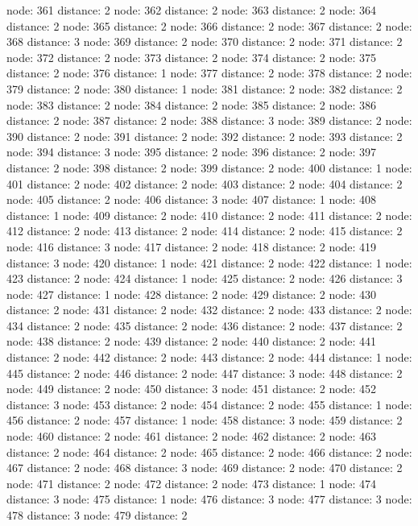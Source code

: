 \documentclass{article}
\begin{document}
node: 361 distance: 2
node: 362 distance: 2
node: 363 distance: 2
node: 364 distance: 2
node: 365 distance: 2
node: 366 distance: 2
node: 367 distance: 2
node: 368 distance: 3
node: 369 distance: 2
node: 370 distance: 2
node: 371 distance: 2
node: 372 distance: 2
node: 373 distance: 2
node: 374 distance: 2
node: 375 distance: 2
node: 376 distance: 1
node: 377 distance: 2
node: 378 distance: 2
node: 379 distance: 2
node: 380 distance: 1
node: 381 distance: 2
node: 382 distance: 2
node: 383 distance: 2
node: 384 distance: 2
node: 385 distance: 2
node: 386 distance: 2
node: 387 distance: 2
node: 388 distance: 3
node: 389 distance: 2
node: 390 distance: 2
node: 391 distance: 2
node: 392 distance: 2
node: 393 distance: 2
node: 394 distance: 3
node: 395 distance: 2
node: 396 distance: 2
node: 397 distance: 2
node: 398 distance: 2
node: 399 distance: 2
node: 400 distance: 1
node: 401 distance: 2
node: 402 distance: 2
node: 403 distance: 2
node: 404 distance: 2
node: 405 distance: 2
node: 406 distance: 3
node: 407 distance: 1
node: 408 distance: 1
node: 409 distance: 2
node: 410 distance: 2
node: 411 distance: 2
node: 412 distance: 2
node: 413 distance: 2
node: 414 distance: 2
node: 415 distance: 2
node: 416 distance: 3
node: 417 distance: 2
node: 418 distance: 2
node: 419 distance: 3
node: 420 distance: 1
node: 421 distance: 2
node: 422 distance: 1
node: 423 distance: 2
node: 424 distance: 1
node: 425 distance: 2
node: 426 distance: 3
node: 427 distance: 1
node: 428 distance: 2
node: 429 distance: 2
node: 430 distance: 2
node: 431 distance: 2
node: 432 distance: 2
node: 433 distance: 2
node: 434 distance: 2
node: 435 distance: 2
node: 436 distance: 2
node: 437 distance: 2
node: 438 distance: 2
node: 439 distance: 2
node: 440 distance: 2
node: 441 distance: 2
node: 442 distance: 2
node: 443 distance: 2
node: 444 distance: 1
node: 445 distance: 2
node: 446 distance: 2
node: 447 distance: 3
node: 448 distance: 2
node: 449 distance: 2
node: 450 distance: 3
node: 451 distance: 2
node: 452 distance: 3
node: 453 distance: 2
node: 454 distance: 2
node: 455 distance: 1
node: 456 distance: 2
node: 457 distance: 1
node: 458 distance: 3
node: 459 distance: 2
node: 460 distance: 2
node: 461 distance: 2
node: 462 distance: 2
node: 463 distance: 2
node: 464 distance: 2
node: 465 distance: 2
node: 466 distance: 2
node: 467 distance: 2
node: 468 distance: 3
node: 469 distance: 2
node: 470 distance: 2
node: 471 distance: 2
node: 472 distance: 2
node: 473 distance: 1
node: 474 distance: 3
node: 475 distance: 1
node: 476 distance: 3
node: 477 distance: 3
node: 478 distance: 3
node: 479 distance: 2
\end{document}
